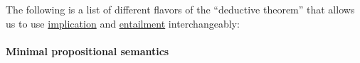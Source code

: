 \begin{remark}\label{rem:deduction_theorem_list}
  The following is a list of different flavors of the \enquote{deductive theorem} that allows us to use \hyperref[def:propositional_alphabet/connectives/conditional]{implication} and \hyperref[def:entailment_system/entailment]{entailment} interchangeably:
  \begin{thmenum}
     
     
  \end{thmenum}
\end{remark}

\paragraph{Minimal propositional semantics}

